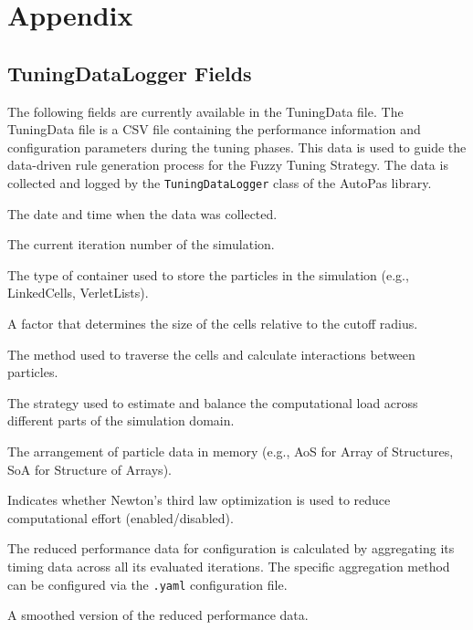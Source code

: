 \chapter{Appendix}

\section{TuningDataLogger Fields}
\label{des:tuningdatafields}

The following fields are currently available in the TuningData file.
The TuningData file is a CSV file containing the performance information and configuration parameters during the tuning phases. This data is used to guide the data-driven rule generation process for the Fuzzy Tuning Strategy. The data is collected and logged by the \texttt{TuningDataLogger} class of the AutoPas library.

\begin{description}[style=multiline, leftmargin =40mm]
  \item[Date] The date and time when the data was collected.
  \item[Iteration] The current iteration number of the simulation.
  \item[Container] The type of container used to store the particles in the simulation (e.g., LinkedCells, VerletLists).
  \item[CellSizeFactor] A factor that determines the size of the cells relative to the cutoff radius.
  \item[Traversal] The method used to traverse the cells and calculate interactions between particles.
  \item[Load Estimator] The strategy used to estimate and balance the computational load across different parts of the simulation domain.
  \item[Data Layout] The arrangement of particle data in memory (e.g., AoS for Array of Structures, SoA for Structure of Arrays).
  \item[Newton 3] Indicates whether Newton's third law optimization is used to reduce computational effort (enabled/disabled).
  \item[Reduced] The reduced performance data for configuration is calculated by aggregating its timing data across all its evaluated iterations. The specific aggregation method can be configured via the \texttt{.yaml} configuration file.
  \item[Smoothed] A smoothed version of the reduced performance data.

\end{description}

